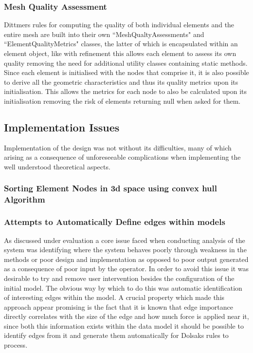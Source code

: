 \documentclass{article}
\begin{document}
\subsubsection{Mesh Quality Assessment}
Dittmers rules for computing the quality of both individual elements and the entire mesh are built into their own ``MeshQualtyAssessments" and ``ElementQualityMetrics" classes, the latter of which is encapsulated within an element object, like with refinement this allows each element to assess its own quality removing the need for additional utility classes containing static methods. \\

Since each element is initialised with the nodes that comprise it, it is also possible to derive all the geometric characteristics and thus its quality metrics upon its initialisation. This allows the metrics for each node to also be calculated upon its initialisation removing the risk of elements returning null when asked for them.


\subsection{Implementation Issues}
Implementation of the design was not without its difficulties, many of which arising as a consequence of unforeseeable complications when implementing the well understood theoretical aspects.


\subsubsection{Sorting Element Nodes in 3d space using convex hull Algorithm}


\subsubsection{Attempts to Automatically Define edges within models}
As discussed under evaluation a core issue faced when conducting analysis of the system was identifying where the system behaves poorly through weakness in the methods or poor design and implementation as opposed to poor output generated as a consequence of poor input by the operator. In order to avoid this issue it was desirable to try and remove user intervention besides the configuration of the initial model. The obvious way by which to do this was automatic identification of interesting edges within the model. A crucial property which made this approach appear promising is the fact that it is known that edge importance directly correlates with the size of the edge and how much force is applied near it, since both this information exists within the data model it should be possible to identify edges from it and generate them automatically for Dolsaks rules to process.
\end{document}
